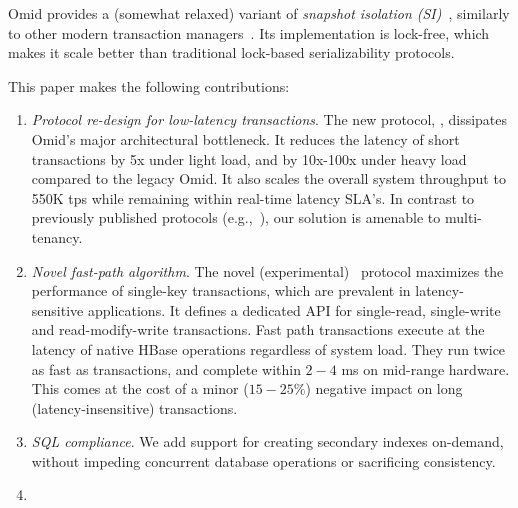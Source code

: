 Omid provides a (somewhat relaxed) variant of \emph{snapshot isolation (SI)}~\cite{DBLP:conf/sigmod/BerensonBGMOO95}, similarly to other modern transaction managers~\cite{Percolator2010,Spanner2012,tephra,cockroach}. Its implementation is lock-free, 
which makes it scale better than traditional lock-based serializability protocols.
{}

This paper makes the following contributions: 
\begin{enumerate}
    \setlength{\itemsep}{1pt}
    \setlength{\parskip}{1pt}
    \setlength{\parsep}{1pt}  

\item {\em Protocol re-design for low-latency transactions}. 
The new protocol,  \sysll, dissipates Omid's major architectural bottleneck. 
It reduces the latency of short transactions by 5x under light load, and 
by 10x-100x under heavy load compared to the legacy Omid. It also scales 
the overall system throughput to 550K tps while remaining 
within real-time latency SLA's. In contrast to previously published protocols 
(e.g.,~\cite{Percolator2010}), our solution is amenable to multi-tenancy.

\item {\em Novel fast-path algorithm\/}. The  novel (experimental) \sys\ protocol  
maximizes the performance of  single-key transactions, which are prevalent 
in latency-sensitive applications. It defines a dedicated API for single-read, 
single-write and read-modify-write transactions.  Fast path transactions execute at the 
latency of native HBase operations regardless of system load.
They run twice as fast as \sysll\/ transactions, and complete within $2-4$ ms on mid-range hardware. 
This comes at the cost of a minor ($15-25\%$) negative impact on long (latency-insensitive) transactions.  

\item {\em SQL compliance\/}. We add support for creating secondary indexes on-demand, 
without impeding concurrent database operations or sacrificing consistency. 
{} 

\item {}

\end{enumerate}

